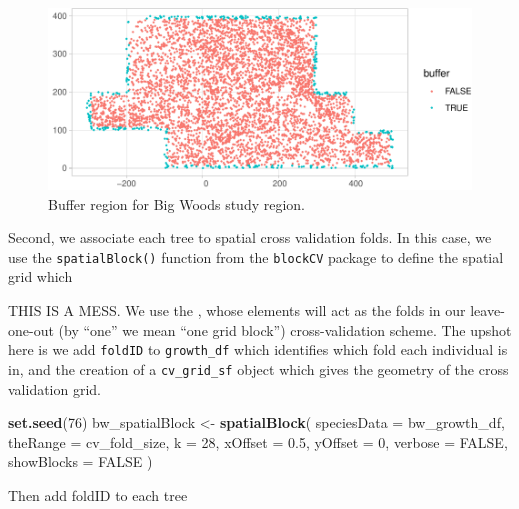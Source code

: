 \documentclass[12pt]{article}
\newenvironment{Shaded}{\begin{snugshade}}{\end{snugshade}}
\newcommand{\DataTypeTok}[1]{\textcolor[rgb]{0.13,0.29,0.53}{#1}}
\newcommand{\DecValTok}[1]{\textcolor[rgb]{0.00,0.00,0.81}{#1}}
\newcommand{\FloatTok}[1]{\textcolor[rgb]{0.00,0.00,0.81}{#1}}
\newcommand{\KeywordTok}[1]{\textcolor[rgb]{0.13,0.29,0.53}{\textbf{#1}}}
\newcommand{\NormalTok}[1]{#1}
\newcommand{\OperatorTok}[1]{\textcolor[rgb]{0.81,0.36,0.00}{\textbf{#1}}}
\newcommand{\OtherTok}[1]{\textcolor[rgb]{0.56,0.35,0.01}{#1}}
\newcommand{\StringTok}[1]{\textcolor[rgb]{0.31,0.60,0.02}{#1}}
\begin{document}
\begin{figure}

{\centering \includegraphics[width=1\linewidth]{Figures/bw-define-buffer-1} 

}

\caption{Buffer region for Big Woods study region.}\label{fig:bw-define-buffer}
\end{figure}

Second, we associate each tree to spatial cross validation folds. In
this case, we use the \texttt{spatialBlock()} function from the
\texttt{blockCV} package to define the spatial grid which

THIS IS A MESS. We use the \citet{valavi_blockcv_2019}, whose elements
will act as the folds in our leave-one-out (by ``one'' we mean ``one
grid block'') cross-validation scheme. The upshot here is we add
\texttt{foldID} to \texttt{growth\_df} which identifies which fold each
individual is in, and the creation of a \texttt{cv\_grid\_sf} object
which gives the geometry of the cross validation grid.

\begin{Shaded}
\begin{Highlighting}[]
\KeywordTok{set.seed}\NormalTok{(}\DecValTok{76}\NormalTok{)}
\NormalTok{bw_spatialBlock <-}\StringTok{ }\KeywordTok{spatialBlock}\NormalTok{(}
  \DataTypeTok{speciesData =}\NormalTok{ bw_growth_df, }\DataTypeTok{theRange =}\NormalTok{ cv_fold_size, }\DataTypeTok{k =} \DecValTok{28}\NormalTok{, }\DataTypeTok{xOffset =} \FloatTok{0.5}\NormalTok{, }
  \DataTypeTok{yOffset =} \DecValTok{0}\NormalTok{, }\DataTypeTok{verbose =} \OtherTok{FALSE}\NormalTok{, }\DataTypeTok{showBlocks =} \OtherTok{FALSE}
\NormalTok{)}
\end{Highlighting}
\end{Shaded}

Then add foldID to each tree

\begin{Shaded}
\end{Shaded}
\end{document}
